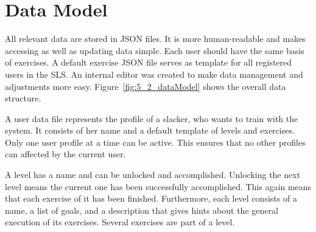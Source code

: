 \section{Data Model}\label{5_2_dataModel}
All relevant data are stored in JSON files. It is more human-readable and makes accessing as well as updating data simple. Each user should have the same basis of exercises. A default exercise JSON file serves as template for all registered users in the SLS. An internal editor was created to make data management and adjustments more easy. Figure~\ref{fig:5_2_dataModel} shows the overall data structure.

A user data file represents the profile of a slacker, who wants to train with the system. It consists of her name and a default template of levels and exercises. Only one user profile at a time can be active. This ensures that no other profiles can affected by the current user.

A level has a name and can be unlocked and accomplished. Unlocking the next level means the current one has been successfully accomplished. This again means that each exercise of it has been finished. Furthermore, each level consists of a name, a list of goals, and a description that gives hints about the general execution of its exercises.
Several exercises are part of a level.


